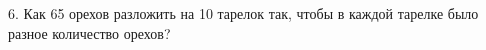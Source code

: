 6. Как 65 орехов разложить на 10 тарелок так, чтобы в каждой тарелке было разное количество орехов?\\
